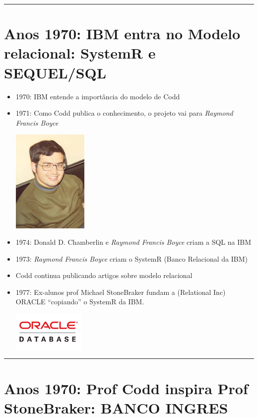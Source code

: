 \documentclass[
]{book}
\begin{document}
\begin{center}\rule{0.5\linewidth}{0.5pt}\end{center}

\section{Anos 1970: IBM entra no Modelo relacional: SystemR e SEQUEL/SQL}\label{anos-1970-ibm-entra-no-modelo-relacional-systemr-e-sequelsql}

\begin{itemize}
\item
  1970: IBM entende a importância do modelo de Codd
\item
  1971: Como Codd publica o conhecimento, o projeto vai para \emph{Raymond Francis Boyce}

  \includegraphics[width=1.4375in,height=\textheight]{images/2025-08-11/05-Boyce.png}
\item
  1974: Donald D. Chamberlin e \emph{Raymond Francis Boyce} criam a SQL na IBM
\item
  1973: \emph{Raymond Francis Boyce} criam o SystemR (Banco Relacional da IBM)
\item
  Codd continua publicando artigos sobre modelo relacional
\item
  1977: Ex-alunos prof Michael StoneBraker fundam a (Relational Inc) ORACLE ``copiando'' o SystemR da IBM.

  \includegraphics[width=1.375in,height=\textheight]{images/2025-08-11/06-oracle.png}
\end{itemize}

\begin{center}\rule{0.5\linewidth}{0.5pt}\end{center}

\section{Anos 1970: Prof Codd inspira Prof StoneBraker: BANCO INGRES}\label{anos-1970-prof-codd-inspira-prof-stonebraker-banco-ingres}
\end{document}
